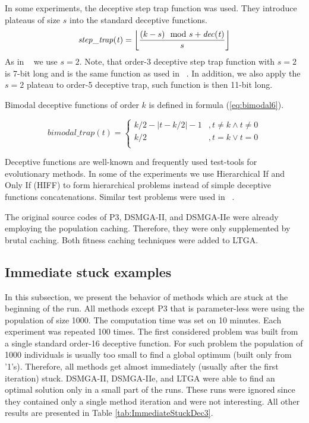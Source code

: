In some experiments, the deceptive step trap function was used. They introduce plateaus of size $s$ into the standard deceptive functions.
\begin{equation}
\label{eq:step_trap}
\mathit{step\_trap(t)} = \floor*{\frac{(k - s) \mod s + \mathit{dec(t)}}{s}}
\end{equation}
As in ~\cite{P3Original} we use $s = 2$. Note, that order-3 deceptive step trap function with $s = 2$ is 7-bit long and is the same function as used in ~\cite{P3Original}. In addition, we also apply the $s = 2$ plateau to order-5 deceptive trap, such function is then 11-bit long.\par

Bimodal deceptive functions of order $k$ is defined in formula (\ref{eq:bimodal6}).

\begin{equation}
\label{eq:bimodal6}
\mathit{bimodal\_trap}(t) = 
\begin{cases}
k / 2 - |t - k/2| - 1 & ,t \neq k \land t \neq 0\\
k / 2 & ,t = k \lor t = 0\\
\end{cases}
\end{equation}



Deceptive functions are well-known and frequently used test-tools for evolutionary methods. In some of the experiments we use Hierarchical If and Only If (HIFF) \cite{hiff2,ltga} to form hierarchical problems instead of simple deceptive functions concatenations. Similar test problems were used in ~\cite{P3Original,dsmga2,dsmga2e,ltga}.\par

The original source codes of P3, DSMGA-II, and DSMGA-IIe were already employing the population caching. Therefore, they were only supplemented by brutal caching. Both fitness caching techniques were added to LTGA.



\subsection{Immediate stuck examples}
\label{sec:ImmediateStuckExamples}

In this subsection, we present the behavior of methods which are stuck at the beginning of the run. All methods except P3 that is parameter-less were using the population of size 1000. The computation time was set on 10 minutes. Each experiment was repeated 100 times. The first considered problem was built from a single standard order-16 deceptive function. For such problem the population of 1000 individuals is usually too small to find a global optimum (built only from '1's). Therefore, all methods get almost immediately (usually after the first iteration) stuck. DSMGA-II, DSMGA-IIe, and LTGA were able to find an optimal solution only in a small part of the runs. These runs were ignored since they contained only a single method iteration and were not interesting. All other results are presented in Table \ref{tab:ImmediateStuckDec3}.


